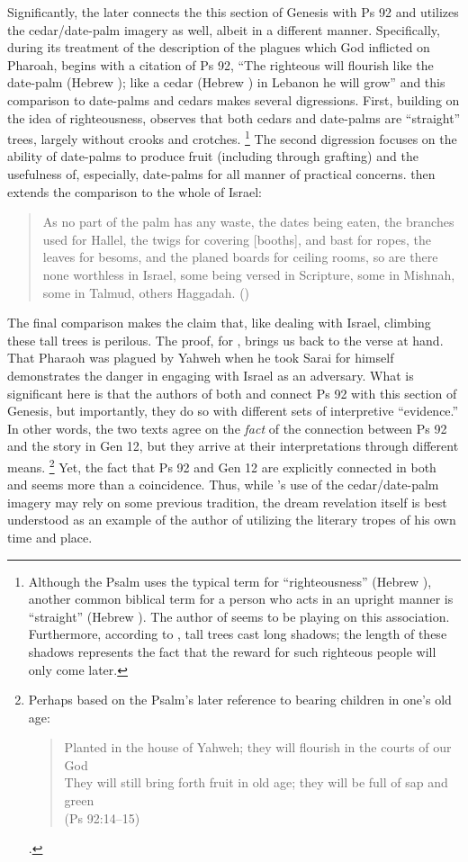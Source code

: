 Significantly, the later \GenRabbah connects the this section of Genesis with Ps 92 and utilizes the cedar/date-palm imagery as well, albeit in a different manner. Specifically, during its treatment of the description of the plagues which God inflicted on Pharoah, \GenRabbah begins with a citation of Ps 92, ``The righteous will flourish like the date-palm (Hebrew ); like a cedar (Hebrew ) in Lebanon he will grow'' and this comparison to date-palms and cedars makes several digressions. First, building on the idea of righteousness, \GenRabbah observes that both cedars and date-palms are ``straight'' trees, largely without crooks and crotches.%
    \footnote{Although the Psalm uses the typical term for ``righteousness'' (Hebrew ), another common biblical term for a person who acts in an upright manner is ``straight'' (Hebrew ). The author of \GenRabbah seems to be playing on this association. Furthermore, according to \GenRabbah, tall trees cast long shadows; the length of these shadows represents the fact that the reward for such righteous people will only come later.}
The second digression focuses on the ability of date-palms to produce fruit (including through grafting) and the usefulness of, especially, date-palms for all manner of practical concerns. \GenRabbah then extends the comparison to the whole of Israel:
\begin{quote}
    As no part of the palm has any waste, the dates being eaten, the branches used for Hallel, the twigs for covering [booths], and bast for ropes, the leaves for besoms, and the planed boards for ceiling rooms, so are there none worthless in Israel, some being versed in Scripture, some in Mishnah, some in Talmud, others Haggadah. ()
\end{quote}
\noindent
The final comparison makes the claim that, like dealing with Israel, climbing these tall trees is perilous. The proof, for \GenRabbah, brings us back to the verse at hand. That Pharaoh was plagued by Yahweh when he took Sarai for himself demonstrates the danger in engaging with Israel as an adversary. What is significant here is that the authors of both \ga and \GenRabbah connect Ps 92 with this section of Genesis, but importantly, they do so with different sets of interpretive ``evidence.'' In other words, the two texts agree on the \emph{fact} of the connection between Ps 92 and the story in Gen 12, but they arrive at their interpretations through different means.%
    \footnote{Perhaps based on the Psalm's later reference to bearing children in one's old age:
    \begin{quote}
        Planted in the house of Yahweh; they will flourish in the courts of our God\\
        They will still bring forth fruit in old age; they will be full of sap and green\\
        (Ps 92:14--15)
    \end{quote}.}
Yet, the fact that Ps 92 and Gen 12 are explicitly connected in both \ga and \GenRabbah seems more than a coincidence. Thus, while \ga's use of the cedar/date-palm imagery may rely on some previous tradition, the dream revelation itself is best understood as an example of the author of \ga utilizing the literary tropes of his own time and place. 

